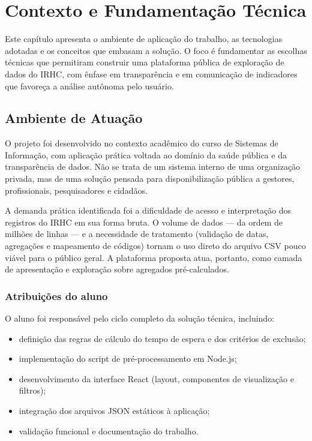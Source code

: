 \chapter[Contexto e Fundamentação Técnica]{Contexto e Fundamentação Técnica}
\label{cap:fundamentacao}

Este capítulo apresenta o ambiente de aplicação do trabalho, as tecnologias adotadas e os conceitos que embasam a solução. O foco é fundamentar as escolhas técnicas que permitiram construir uma plataforma pública de exploração de dados do \acs{IRHC}, com ênfase em transparência e em comunicação de indicadores que favoreça a análise autônoma pelo usuário.

\section{Ambiente de Atuação}

O projeto foi desenvolvido no contexto acadêmico do curso de Sistemas de Informação, com aplicação prática voltada ao domínio da saúde pública e da transparência de dados. Não se trata de um sistema interno de uma organização privada, mas de uma solução pensada para disponibilização pública a gestores, profissionais, pesquisadores e cidadãos.

A demanda prática identificada foi a dificuldade de acesso e interpretação dos registros do \acs{IRHC} em sua forma bruta. O volume de dados --- da ordem de milhões de linhas --- e a necessidade de tratamento (validação de datas, agregações e mapeamento de códigos) tornam o uso direto do arquivo \acs{CSV} pouco viável para o público geral. A plataforma proposta atua, portanto, como camada de apresentação e exploração sobre agregados pré-calculados.

\subsection{Atribuições do aluno}

O aluno foi responsável pelo ciclo completo da solução técnica, incluindo:
\begin{itemize}
	\item definição das regras de cálculo do tempo de espera e dos critérios de exclusão;
	\item implementação do script de pré-processamento em Node.js;
	\item desenvolvimento da interface React (layout, componentes de visualização e filtros);
	\item integração dos arquivos \acs{JSON} estáticos à aplicação;
	\item validação funcional e documentação do trabalho.
\end{itemize}

